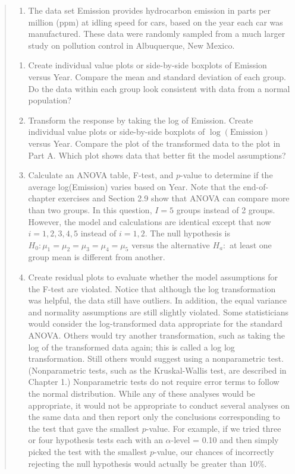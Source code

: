 \documentclass[
]{report}
\providecommand{\tightlist}{%
  \setlength{\itemsep}{0pt}\setlength{\parskip}{0pt}}
\begin{document}
\begin{quote}
\begin{enumerate}
\def\labelenumi{\arabic{enumi}.}
\setcounter{enumi}{30}
\tightlist
\item
  The data set Emission provides hydrocarbon emission in parts per million (ppm) at idling speed for cars, based on the year each car was manufactured. These data were randomly sampled from a much larger study on pollution control in Albuquerque, New Mexico.\\
\end{enumerate}

\begin{enumerate}
\def\labelenumi{\alph{enumi}.}
\tightlist
\item
  Create individual value plots or side-by-side boxplots of Emission versus Year. Compare the mean and standard deviation of each group. Do the data within each group look consistent with data from a normal population?\\
\item
  Transform the response by taking the log of Emission. Create individual value plots or side-by-side boxplots of \(\log(\text{Emission})\) versus Year. Compare the plot of the transformed data to the plot in Part A. Which plot shows data that better fit the model assumptions?\\
\item
  Calculate an ANOVA table, F-test, and \(p\)-value to determine if the average log(Emission) varies based on Year. Note that the end-of-chapter exercises and Section 2.9 show that ANOVA can compare more than two groups. In this question, \(I = 5\) groups instead of 2 groups. However, the model and calculations are identical except that now \(i = 1, 2, 3, 4, 5\) instead of \(i = 1, 2\). The null hypothesis is \(H_0\!:\! \mu_1 = \mu_2 = \mu_3 = \mu_4 = \mu_5\) versus the alternative \(H_a\!:\!\) at least one group mean is different from another.\\
\item
  Create residual plots to evaluate whether the model assumptions for the F-test are violated.
  Notice that although the log transformation was helpful, the data still have outliers. In addition, the equal variance and normality assumptions are still slightly violated. Some statisticians would consider the log-transformed data appropriate for the standard ANOVA. Others would try another transformation, such as taking the log of the transformed data again; this is called a log log transformation. Still others would suggest using a nonparametric test. (Nonparametric tests, such as the Kruskal-Wallis test, are described in Chapter 1.) Nonparametric tests do not require error terms to follow the normal distribution. While any of these analyses would be appropriate, it would not be appropriate to conduct several analyses on the same data and then report only the conclusions corresponding to the test that gave the smallest \(p\)-value. For example, if we tried three or four hypothesis tests each with an \(\alpha\)-level = 0.10 and then simply picked the test with the smallest \(p\)-value, our chances of incorrectly rejecting the null hypothesis would actually be greater than 10\%.

\end{enumerate}
\end{quote}
\end{document}
